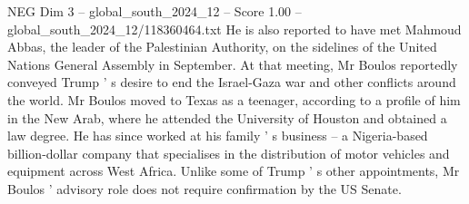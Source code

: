 \begin{textsample}{NEG Dim 3 – global\_south\_2024\_12 – Score 1.00 – global\_south\_2024\_12/118360464.txt}
He is also reported to have met Mahmoud Abbas, the leader of the Palestinian Authority, on the sidelines of the United Nations General Assembly in September.
At that meeting, Mr Boulos reportedly conveyed Trump ' s desire to end the Israel-Gaza war and other conflicts around the world.
Mr Boulos moved to Texas as a teenager, according to a profile of him in the New Arab, where he attended the University of Houston and obtained a law degree.
He has since worked at his family ' s business -- a Nigeria-based billion-dollar company that specialises in the distribution of motor vehicles and equipment across West Africa.
Unlike some of Trump ' s other appointments, Mr Boulos ' advisory role does not require confirmation by the US Senate.

\end{textsample}
